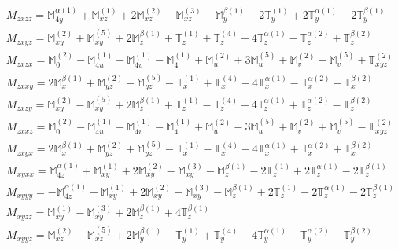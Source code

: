 \documentclass[fleqn,8pt,landscape]{jsarticle}
\begin{document}
\begin{align*}
& M_{zxzz} = \mathbb{M}_{4y}^{\alpha(1)} + \mathbb{M}_{xz}^{(1)} + 2 \mathbb{M}_{xz}^{(2)} - \mathbb{M}_{xz}^{(3)} - \mathbb{M}_{y}^{\beta(1)} - 2 \mathbb{T}_{y}^{(1)} + 2 \mathbb{T}_{y}^{\alpha(1)} - 2 \mathbb{T}_{y}^{\beta(1)} \\
& M_{zxyz} = \mathbb{M}_{xy}^{(2)} + \mathbb{M}_{xy}^{(5)} + 2 \mathbb{M}_{z}^{\beta(1)} + \mathbb{T}_{z}^{(1)} + \mathbb{T}_{z}^{(4)} + 4 \mathbb{T}_{z}^{\alpha(1)} - \mathbb{T}_{z}^{\alpha(2)} + \mathbb{T}_{z}^{\beta(2)} \\
& M_{zxzx} = \mathbb{M}_{0}^{(2)} - \mathbb{M}_{4u}^{(1)} - \mathbb{M}_{4v}^{(1)} - \mathbb{M}_{4}^{(1)} + \mathbb{M}_{u}^{(2)} + 3 \mathbb{M}_{u}^{(5)} + \mathbb{M}_{v}^{(2)} - \mathbb{M}_{v}^{(5)} + \mathbb{T}_{xyz}^{(2)} \\
& M_{zxxy} = 2 \mathbb{M}_{x}^{\beta(1)} + \mathbb{M}_{yz}^{(2)} - \mathbb{M}_{yz}^{(5)} - \mathbb{T}_{x}^{(1)} + \mathbb{T}_{x}^{(4)} - 4 \mathbb{T}_{x}^{\alpha(1)} - \mathbb{T}_{x}^{\alpha(2)} - \mathbb{T}_{x}^{\beta(2)} \\
& M_{zxzy} = \mathbb{M}_{xy}^{(2)} - \mathbb{M}_{xy}^{(5)} + 2 \mathbb{M}_{z}^{\beta(1)} + \mathbb{T}_{z}^{(1)} - \mathbb{T}_{z}^{(4)} + 4 \mathbb{T}_{z}^{\alpha(1)} + \mathbb{T}_{z}^{\alpha(2)} - \mathbb{T}_{z}^{\beta(2)} \\
& M_{zxxz} = \mathbb{M}_{0}^{(2)} - \mathbb{M}_{4u}^{(1)} - \mathbb{M}_{4v}^{(1)} - \mathbb{M}_{4}^{(1)} + \mathbb{M}_{u}^{(2)} - 3 \mathbb{M}_{u}^{(5)} + \mathbb{M}_{v}^{(2)} + \mathbb{M}_{v}^{(5)} - \mathbb{T}_{xyz}^{(2)} \\
& M_{zxyx} = 2 \mathbb{M}_{x}^{\beta(1)} + \mathbb{M}_{yz}^{(2)} + \mathbb{M}_{yz}^{(5)} - \mathbb{T}_{x}^{(1)} - \mathbb{T}_{x}^{(4)} - 4 \mathbb{T}_{x}^{\alpha(1)} + \mathbb{T}_{x}^{\alpha(2)} + \mathbb{T}_{x}^{\beta(2)} \\
& M_{xyxx} = \mathbb{M}_{4z}^{\alpha(1)} + \mathbb{M}_{xy}^{(1)} + 2 \mathbb{M}_{xy}^{(2)} - \mathbb{M}_{xy}^{(3)} - \mathbb{M}_{z}^{\beta(1)} - 2 \mathbb{T}_{z}^{(1)} + 2 \mathbb{T}_{z}^{\alpha(1)} - 2 \mathbb{T}_{z}^{\beta(1)} \\
& M_{xyyy} = - \mathbb{M}_{4z}^{\alpha(1)} + \mathbb{M}_{xy}^{(1)} + 2 \mathbb{M}_{xy}^{(2)} - \mathbb{M}_{xy}^{(3)} - \mathbb{M}_{z}^{\beta(1)} + 2 \mathbb{T}_{z}^{(1)} - 2 \mathbb{T}_{z}^{\alpha(1)} - 2 \mathbb{T}_{z}^{\beta(1)} \\
& M_{xyzz} = \mathbb{M}_{xy}^{(1)} - \mathbb{M}_{xy}^{(3)} + 2 \mathbb{M}_{z}^{\beta(1)} + 4 \mathbb{T}_{z}^{\beta(1)} \\
& M_{xyyz} = \mathbb{M}_{xz}^{(2)} - \mathbb{M}_{xz}^{(5)} + 2 \mathbb{M}_{y}^{\beta(1)} - \mathbb{T}_{y}^{(1)} + \mathbb{T}_{y}^{(4)} - 4 \mathbb{T}_{y}^{\alpha(1)} - \mathbb{T}_{y}^{\alpha(2)} - \mathbb{T}_{y}^{\beta(2)} \\

\end{align*}
\end{document}
